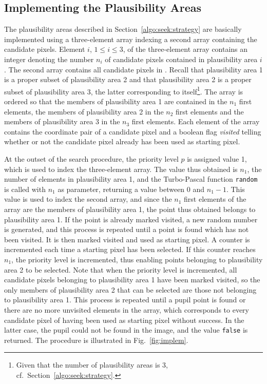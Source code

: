 \subsection{Implementing the Plausibility Areas}
\label{implem:details:plausible}

The plausibility areas described in Section~\ref{algo:seek:strategy}
are basically implemented using a three-element array indexing a
second array containing the candidate pixels.  Element $i$, $1\leq
i\leq 3$, of the three-element array contains an integer denoting the
number $n_{i}$ of candidate pixels contained in plausibility area $i$.
The second array contains all candidate pixels in {\SS}.  Recall that
plausibility area 1 is a proper subset of plausibility area 2 and that
plausibility area 2 is a proper subset of plausibility area 3, the
latter corresponding to {\SS} itself\footnote{Given that the number of
  plausibility areas is 3, cf.\ Section~\ref{algo:seek:strategy}.}.
The array is ordered so that the members of plausibility area 1 are
contained in the $n_{1}$ first elements, the members of plausibility
area 2 in the $n_{2}$ first elements and the members of plausibility
area 3 in the $n_{3}$ first elements.  Each element of the array
contains the coordinate pair of a candidate pixel and a boolean flag
{\sl visited\/} telling whether or not the candidate pixel already has
been used as starting pixel.  

At the outset of the search procedure, the priority level $p$ is
assigned value 1, which is used to index the three-element array.  The
value thus obtained is $n_{1}$, the number of elements in plausibility
area 1, and the Turbo-Pascal function {\tt random} is called with
$n_{1}$ as parameter, returning a value between 0 and $n_{1}-1$.  This
value is used to index the second array, and since the $n_{1}$ first
elements of the array are the members of plausibility area 1, the
point thus obtained belongs to plausibility area 1.  If the point is
already marked visited, a new random number is generated, and this
process is repeated until a point is found which has not been visited.
It is then marked visited and used as starting pixel.  A counter is
incremented each time a starting pixel has been selected.  If this
counter reaches $n_{1}$, the priority level is incremented, thus
enabling points belonging to plausibility area 2 to be selected.  Note
that when the priority level is incremented, all candidate pixels
belonging to plausibility area 1 have been marked visited, so the only
members of plausibility area 2 that can be selected are those not
belonging to plausibility area 1.  This process is repeated until a
pupil point is found or there are no more unvisited elements in the
array, which corresponds to every candidate pixel of {\SS} having been
used as starting pixel without success.  In the latter case, the pupil
could not be found in the image, and the value {\tt false} is
returned.  The procedure is illustrated in Fig.~\ref{fig:implem}.

